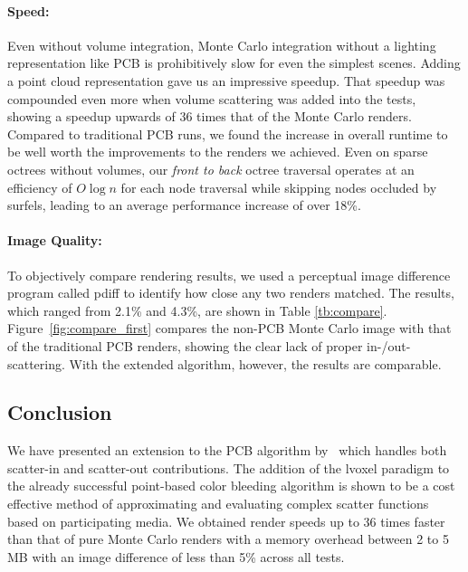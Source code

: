 \documentclass[runningheads]{llncs}
\begin{document}
\paragraph{Speed:}
Even without volume integration, Monte Carlo integration without a lighting representation like PCB is prohibitively slow for even the simplest scenes.  Adding a point cloud representation gave us an impressive speedup.  That speedup was compounded even more when volume scattering was added into the tests, showing a speedup upwards of 36 times that of the Monte Carlo renders.  Compared to traditional PCB runs, we found the increase in overall runtime to be well worth the improvements to the renders we achieved. Even on sparse octrees without volumes, our \textit{front to back} octree traversal operates at an efficiency of $O\log{n}$ for each node traversal while skipping nodes occluded by surfels, leading to an average performance increase of over 18\%.

\paragraph{Image Quality:}
To objectively compare rendering results, we used a perceptual image difference program called pdiff to identify how close any two renders matched.  The results, which ranged from 2.1\% and 4.3\%, are shown in Table \ref{tb:compare}.  Figure~\ref{fig:compare_first} compares the non-PCB Monte Carlo image with that of the traditional PCB renders, showing the clear lack of proper in-/out-scattering.  With the extended algorithm, however, the results are comparable.

\subsection{Conclusion}

We have presented an extension to the PCB algorithm by~\cite{christensen:2008} which handles both scatter-in and scatter-out contributions.  The addition of the lvoxel paradigm to the already successful point-based color bleeding algorithm is shown to be a cost effective method of approximating and evaluating complex scatter functions based on participating media.  We obtained render speeds up to 36 times faster than that of pure Monte Carlo renders with a memory overhead between 2 to 5 MB with an image difference of less than 5\% across all tests.

\end{document}
